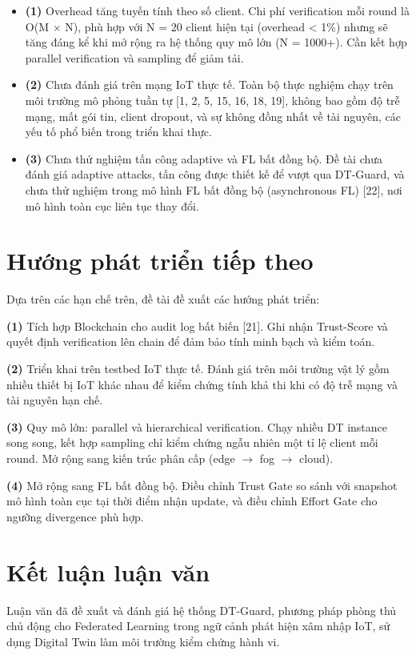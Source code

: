 \begin{itemize}
\item
  \textbf{(1)} Overhead tăng tuyến tính theo số client. Chi phí verification mỗi round là O(M $\times$ N), phù hợp với N = 20 client hiện tại (overhead \textless{} 1\%) nhưng sẽ tăng đáng kể khi mở rộng ra hệ thống quy mô lớn (N = 1000+). Cần kết hợp parallel verification và sampling để giảm tải.
\item
  \textbf{(2)} Chưa đánh giá trên mạng IoT thực tế. Toàn bộ thực nghiệm chạy trên môi trường mô phỏng tuần tự {[}1, 2, 5, 15, 16, 18, 19{]}, không bao gồm độ trễ mạng, mất gói tin, client dropout, và sự không đồng nhất về tài nguyên, các yếu tố phổ biến trong triển khai thực.
\item
  \textbf{(3)} Chưa thử nghiệm tấn công adaptive và FL bất đồng bộ. Đề tài chưa đánh giá adaptive attacks, tấn công được thiết kế để vượt qua DT-Guard, và chưa thử nghiệm trong mô hình FL bất đồng bộ (asynchronous FL) {[}22{]}, nơi mô hình toàn cục liên tục thay đổi.
\end{itemize}

\section{Hướng phát triển tiếp theo}
Dựa trên các hạn chế trên, đề tài đề xuất các hướng phát triển:

\textbf{(1)} Tích hợp Blockchain cho audit log bất biến {[}21{]}. Ghi nhận Trust-Score và quyết định verification lên chain để đảm bảo tính minh bạch và kiểm toán.

\textbf{(2)} Triển khai trên testbed IoT thực tế. Đánh giá trên môi trường vật lý gồm nhiều thiết bị IoT khác nhau để kiểm chứng tính khả thi khi có độ trễ mạng và tài nguyên hạn chế.

\textbf{(3)} Quy mô lớn: parallel và hierarchical verification. Chạy nhiều DT instance song song, kết hợp sampling chỉ kiểm chứng ngẫu nhiên một tỉ lệ client mỗi round. Mở rộng sang kiến trúc phân cấp (edge $\rightarrow$ fog $\rightarrow$ cloud).

\textbf{(4)} Mở rộng sang FL bất đồng bộ. Điều chỉnh Trust Gate so sánh với snapshot mô hình toàn cục tại thời điểm nhận update, và điều chỉnh Effort Gate cho ngưỡng divergence phù hợp.

\section{Kết luận luận văn}
Luận văn đã đề xuất và đánh giá hệ thống DT-Guard, phương pháp phòng thủ chủ động cho Federated Learning trong ngữ cảnh phát hiện xâm nhập IoT, sử dụng Digital Twin làm môi trường kiểm chứng hành vi.

